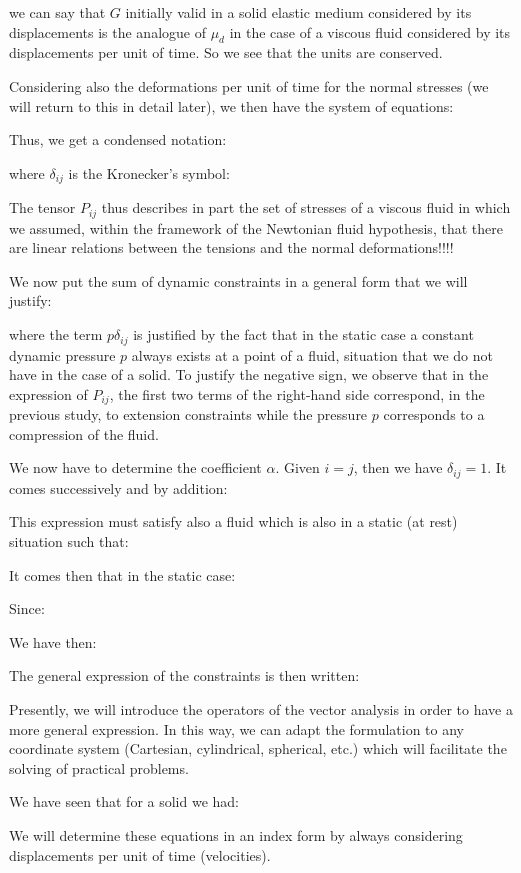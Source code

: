 	we can say that $G$ initially valid in a solid elastic medium considered by its displacements is the analogue of $\mu_d$ in the case of a viscous fluid considered by its displacements per unit of time. So we see that the units are conserved.

	Considering also the deformations per unit of time for the normal stresses (we will return to this in detail later), we then have the system of equations:
	
	Thus, we get a condensed notation:
	
	where $\delta_{ij}$ is the Kronecker's symbol:
	
	The tensor $P_{ij}$ thus describes in part the set of stresses of a viscous fluid in which we assumed, within the framework of the Newtonian fluid hypothesis, that there are linear relations between the tensions and the normal deformations!!!!

	We now put the sum of dynamic constraints in a general form that we will justify:
	
	where the term $p\delta_{ij}$ is justified by the fact that in the static case a constant dynamic pressure $p$ always exists at a point of a fluid, situation that we do not have in the case of a solid. To justify the negative sign, we observe that in the expression of $P_{ij}$, the first two terms of the right-hand side correspond, in the previous study, to extension constraints while the pressure $p$ corresponds to a compression of the fluid.
	
	We now have to determine the coefficient $\alpha$. Given $i=j$, then we have $\delta_{ij}=1$. It comes successively and by addition:
	
	This expression must satisfy also a fluid which is also in a static (at rest) situation such that:
	
	It comes then that in the static case:
	
	Since:
	
	We have then:	
	
	The general expression of the constraints is then written:
	
	Presently, we will introduce the operators of the vector analysis in order to have a more general expression. In this way, we can adapt the formulation to any coordinate system (Cartesian, cylindrical, spherical, etc.) which will facilitate the solving of practical problems.
	
	We have seen that for a solid we had:
	
	We will determine these equations in an index form by always considering displacements per unit of time (velocities).
	
